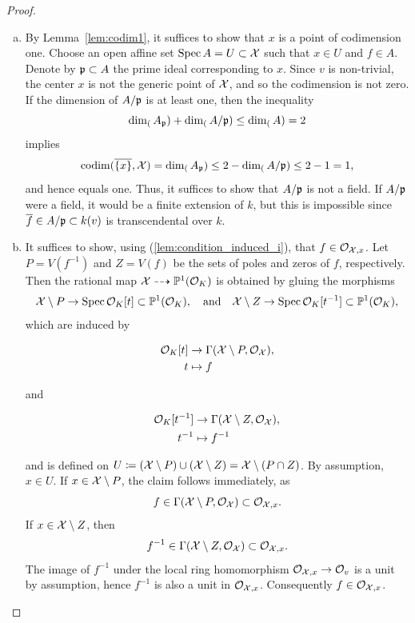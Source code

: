 \begin{proof}
    \begin{enumerate}[(a)]
    \item By Lemma~\ref{lem:codim1}, it suffices to show that $x$ is a point of codimension one.
    Choose an open affine set $\operatorname{Spec} A = U \subset \mathcal X$ such that $x \in U$ and $f \in A$.
    Denote by $\mathfrak p \subset A$ the prime ideal corresponding to $x$.
    Since $v$ is non-trivial, the center $x$ is not the generic point of $\mathcal X$, and so the codimension is not zero.
    If the dimension of $A/\mathfrak p$ is at least one, then the inequality
    \[
        \operatorname{dim_{(}}A_\mathfrak p) + \operatorname{dim_{(}}A/\mathfrak p) \leq \operatorname{dim_{(}}A) = 2
    \]
    implies
    \[
        \operatorname{codim}(\overline{\{x\}}, \mathcal X) = \operatorname{dim_{(}}A_\mathfrak p) \leq 2 - \operatorname{dim_{(}}A/\mathfrak p) \leq 2 - 1 = 1,
    \]
    and hence equals one.
    Thus, it suffices to show that $A/\mathfrak p$ is not a field.
    If $A/\mathfrak p$ were a field, it would be a finite extension
    of $k$, but this is impossible since $\overline{f} \in A/\mathfrak p \subset k(v)$ is transcendental over $k$.
    \item It suffices to show, using (\ref{lem:condition_induced_i}), that $f \in \mathcal{O}_{\mathcal X, x}$.
    Let $P = V(f^{-1})$ and $Z = V(f)$ be the sets of poles and zeros of $f$, respectively.
    Then the rational map $\mathcal X \dashrightarrow \mathbb P^1(\mathcal O_K )$ is obtained by gluing the morphisms
    \[
        \mathcal X \setminus P  \to \operatorname{Spec} \mathcal O_K [t] \subset \mathbb P^1(\mathcal O_K ), \quad \textrm{and} \quad
        \mathcal X \setminus Z \to \operatorname{Spec} \mathcal O_K [t^{-1}] \subset \mathbb P^1(\mathcal O_K ),
    \]
    which are induced by
    \begin{center}
        \begin{minipage}{0.25\textwidth}
            \begin{align*}
                \mathcal O_K [t] &\to \Gamma(\mathcal X \setminus P, \mathcal{O}_{\mathcal X}), \\
                t &\mapsto f
            \end{align*}
        \end{minipage}
        \quad and \quad
        \begin{minipage}{0.25\textwidth}
            \begin{align*}
                \mathcal O_K [t^{-1}] &\to \Gamma(\mathcal X \setminus Z, \mathcal{O}_{\mathcal X}), \\
                t^{-1} &\mapsto f^{-1}
            \end{align*}
        \end{minipage}
    \end{center}
    and is defined on $U \coloneqq (\mathcal X \setminus P) \cup (\mathcal X \setminus Z) = \mathcal X \setminus (P \cap Z)$.
    By assumption, $x \in U$. If $x \in \mathcal X \setminus P$, the claim follows immediately, as
    \[
        f \in \Gamma(\mathcal X \setminus P, \mathcal{O}_{\mathcal X}) \subset \mathcal{O}_{\mathcal X, x}.
    \]
    If $x \in \mathcal X \setminus Z$, then
    \[
        f^{-1} \in \Gamma(\mathcal X \setminus Z, \mathcal{O}_{\mathcal X}) \subset \mathcal{O}_{\mathcal X, x}.
    \]
    The image of $f^{-1}$ under the local ring homomorphism $\mathcal{O}_{\mathcal X, x} \to \mathcal{O}_v$ is a unit by assumption,
    hence $f^{-1}$ is also a unit in $\mathcal{O}_{\mathcal X, x}$.
    Consequently $f \in \mathcal{O}_{\mathcal X, x}$.
    \end{enumerate}
\end{proof}


